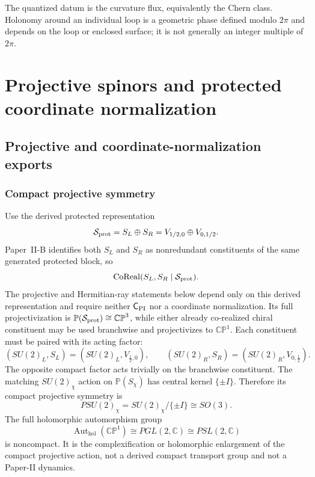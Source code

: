 \documentclass[12pt,a4paper]{article}
\begin{document}
\begin{remark}
The quantized datum is the curvature flux, equivalently the Chern class.
Holonomy around an individual loop is a geometric phase defined modulo
\(2\pi\) and depends on the loop or enclosed surface; it is not generally an
integer multiple of \(2\pi\).
\end{remark}

\section{Projective spinors and protected coordinate normalization}
\label{paper2e:sec:organized-projective}

\subsection{Projective and coordinate-normalization exports}
\label{p2:sec:kin-gravity-ident}

\subsubsection{Compact projective symmetry}
\label{p2:subsec:grav-projective-kin}

Use the derived protected representation
\[
\mathcal S_{\rm prot}=S_L\oplus S_R
=V_{1/2,0}\oplus V_{0,1/2}.
\]
Paper~II-B identifies both \(S_L\) and \(S_R\) as nonredundant constituents of
the same generated protected block, so
\[
 \operatorname{CoReal}(S_L,S_R\mid\mathcal S_{\rm prot}).
\]
The projective and Hermitian-ray statements below depend only on this derived
representation and require neither \(\mathsf C_{\rm PI}\) nor a coordinate
normalization.  Its full projectivization is
\(\mathbb P(\mathcal S_{\rm prot})\cong\mathbb{CP}^3\), while either already
co-realized chiral constituent may be used branchwise and projectivizes to
\(\mathbb{CP}^1\).  Each constituent must be paired with its acting factor:
\[
 (SU(2)_L,S_L)=(SU(2)_L,V_{\frac12,0}),
 \qquad
 (SU(2)_R,S_R)=(SU(2)_R,V_{0,\frac12}).
\]
The opposite compact factor acts trivially on the branchwise constituent.  The
matching \(SU(2)_\chi\) action on \(\mathbb P(S_\chi)\) has central kernel
\(\{\pm I\}\).  Therefore its compact projective symmetry is
\[
        PSU(2)_\chi=SU(2)_\chi/\{\pm I\}\cong SO(3).
\]
The full holomorphic automorphism group
\[
        \operatorname{Aut}_{\mathrm{hol}}(\mathbb{CP}^1)
        \cong PGL(2,\mathbb C)
        \cong PSL(2,\mathbb C)
\]
is noncompact.  It is the complexification or holomorphic enlargement of the
compact projective action, not a derived compact transport group and not a
Paper-II dynamics.
\end{document}

